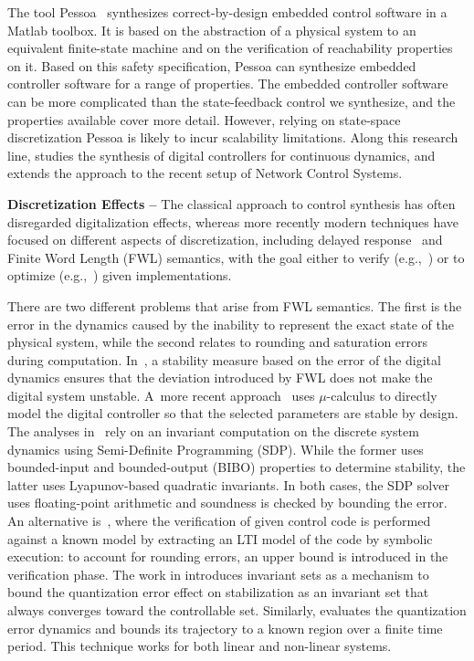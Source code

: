 \documentclass[sigconf]{llncs}
\begin{document}
The tool Pessoa~\cite{mazo2010pessoa} synthesizes correct-by-design embedded
control software in a Matlab toolbox.  It is based on the abstraction of a
physical system to an equivalent finite-state machine and on the
verification of reachability properties on it.  Based on this safety
specification, \mbox{Pessoa} can synthesize embedded controller software for
a range of properties.  The embedded controller software can be more
complicated than the state-feedback control we synthesize, and the
properties available cover more detail.  However, relying on state-space
discretization \mbox{Pessoa} is likely to incur scalability limitations. 
Along this research line, \cite{Anta2010,liu16} studies the synthesis of
digital controllers for continuous dynamics, and \cite{zamani2014} extends
the approach to the recent setup of Network Control Systems.

\smallskip

\noindent\textbf{Discretization Effects --}
The classical approach to control synthesis has often disregarded
digitalization effects, whereas more recently modern techniques have focused
on different aspects of discretization, including delayed
response~\cite{Duggirala2015} and Finite Word Length (FWL) semantics, with
the goal either to verify (e.g.,~\cite{daes20161}) or to optimize
(e.g.,~\cite{oudjida2014design}) given implementations.

There are two different problems that arise from FWL semantics.  The first
is the error in the dynamics caused by the inability to represent the exact
state of the physical system, while the second relates to rounding and
saturation errors during computation.  In~\cite{fialho1994stability}, a
stability measure based on the error of the digital dynamics ensures that
the deviation introduced by FWL does not make the digital system unstable. 
A~more recent approach~\cite{DBLP:journals/automatica/WuLCC09} uses
$\mu$-calculus to directly model the digital controller so that the selected
parameters are stable by design.  The analyses
in~\cite{DBLP:conf/hybrid/RouxJG15,DBLP:conf/hybrid/WangGRJF16} rely on an
invariant computation on the discrete system dynamics using Semi-Definite
Programming (SDP).  While the former uses bounded-input and bounded-output
(BIBO) properties to determine stability, the latter uses Lyapunov-based
quadratic invariants.  In both cases, the SDP solver uses floating-point
arithmetic and soundness is checked by bounding the error.  An alternative
is~\cite{park2016scalable}, where the verification of given control code is
performed against a known model by extracting an LTI model of the code by
symbolic execution: to account for rounding errors, an upper bound is
introduced in the verification phase.  The work in
\cite{picasso2003stabilization} introduces invariant sets as a mechanism to
bound the quantization error effect on stabilization as an invariant set
that always converges toward the controllable set.  Similarly,
\cite{liberzon2003hybrid} evaluates the quantization error dynamics and
bounds its trajectory to a known region over a finite time period.  This
technique works for both linear and non-linear systems.
\end{document}

